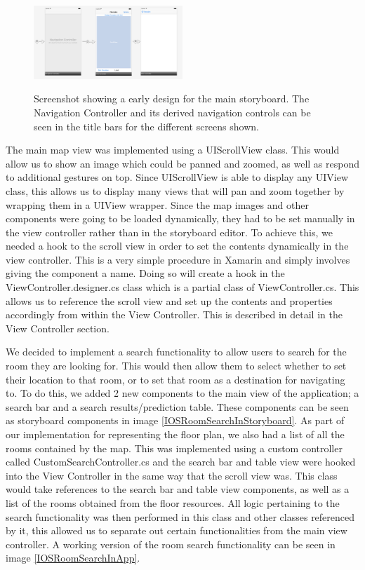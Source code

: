 \documentclass[12pt,a4paper]{report}
\begin{document}
\begin{figure}[]
\centering
\includegraphics[width=0.5\textwidth]{images-implementation/InitialStoryboard.png}
\label{initStoryboard}
\caption{Screenshot showing a early design for the main storyboard. The Navigation Controller and its derived navigation controls can be seen in the title bars for the different screens shown.}
\end{figure}

The main map view was implemented using a UIScrollView class. This would allow us to show an image which could be panned and zoomed, as well as respond to additional gestures on top. Since UIScrollView is able to display any UIView class, this allows us to display many views that will pan and zoom together by wrapping them in a UIView wrapper. Since the map images and other components were going to be loaded dynamically, they had to be set manually in the view controller rather than in the storyboard editor. To achieve this, we needed a hook to the scroll view in order to set the contents dynamically in the view controller. This is a very simple procedure in Xamarin and simply involves giving the component a name. Doing so will create a hook in the ViewController.designer.cs class which is a partial class of ViewController.cs. This allows us to reference the scroll view and set up the contents and properties accordingly from within the View Controller. This is described in detail in the View Controller section.

We decided to implement a search functionality to allow users to search for the room they are looking for. This would then allow them to select whether to set their location to that room, or to set that room as a destination for navigating to. To do this, we added 2 new components to the main view of the application; a search bar and a search results/prediction table. These components can be seen as storyboard components in image \ref{IOSRoomSearchInStoryboard}. As part of our implementation for representing the floor plan, we also had a list of all the rooms contained by the map. This was implemented using a custom controller called CustomSearchController.cs and the search bar and table view were hooked into the View Controller in the same way that the scroll view was. This class would take references to the search bar and table view components, as well as a list of the rooms obtained from the floor resources. All logic pertaining to the search functionality was then performed in this class and other classes referenced by it, this allowed us to separate out certain functionalities from the main view controller. A working version of the room search functionality can be seen in image \ref{IOSRoomSearchInApp}.
\end{document}
